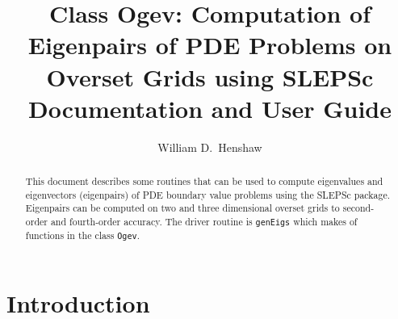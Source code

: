 \documentclass[preprint,11pt]{elsarticle}
\begin{document}
\begin{frontmatter}
 \title{Class Ogev: Computation of Eigenpairs of PDE Problems on Overset Grids using SLEPSc\\
        Documentation and User Guide}



\author[rpi]{William D.~Henshaw}



\address[rpi]{Department of Mathematical Sciences, Rensselaer Polytechnic Institute, Troy, NY 12180, USA}







\begin{abstract}
This document describes some routines that can be used to compute eigenvalues and eigenvectors (eigenpairs) of PDE boundary
value problems using the SLEPSc package.
Eigenpairs can be computed on two and three dimensional overset grids to second-order and fourth-order accuracy.
The driver routine is \texttt{genEigs} which makes of functions in the class \texttt{Ogev}.


\end{abstract}

\end{frontmatter}


\tableofcontents

\clearpage
\section{Introduction} 
\end{document}
